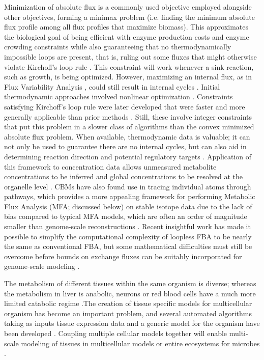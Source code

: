 \documentclass[phd,tocprelim]{cornell}
\begin{document}
Minimization of absolute flux is a commonly used objective employed
alongside other objectives, forming a minimax problem (i.e. finding
the minimum absolute flux profile among all flux profiles that
maximize biomass). This approximates the biological goal of being
efficient with enzyme production costs and enzyme crowding constraints
while also guaranteeing that no thermodynamically impossible loops are
present, that is, ruling out some fluxes that might otherwise violate
Kirchoff’s loop rule \citep{Smallbone2009a, Schellenberger2011}.  This
constraint will work whenever a sink reaction, such as growth, is
being optimized.  However, maximizing an internal flux, as in Flux
Variability Analysis \citep{Orth2010}, could still result in internal
cycles \citep{Schellenberger2011}. Initial thermodynamic approaches
involved nonlinear optimization \citep{Beard2002, Henry2006,
Henry2007, Kummel2006}. Constraints satisfying Kirchoff’s loop rule
were later developed that were faster and more generally applicable
than prior methods \citep{Schellenberger2011, Muller2013}.  Still,
these involve integer constraints that put this problem in a slower
class of algorithms than the convex minimized absolute flux problem.
When available, thermodynamic data is valuable; it can not only be
used to guarantee there are no internal cycles, but can also aid in
determining reaction direction and potential regulatory targets
\citep{Schellenberger2011, Henry2006, Haraldsdottir2012,
DeMartino2012}. Application of this framework to concentration data
allows unmeasured metabolite concentrations to be inferred and global
concentrations to be resolved at the organelle level
\citep{Kummel2006}. CBMs have also found use in tracing individual
atoms through pathways, which provides a more appealing framework for
performing Metabolic Flux Analysis (MFA; discussed below) on stable
isotope data due to the lack of bias compared to typical MFA models,
which are often an order of magnitude smaller than genome-scale
reconstructions \citep{Ravikirthi2011}.  Recent insightful work has
made it possible to simplify the computational complexity of loopless
FBA to be nearly the same as conventional FBA, but some mathematical
difficulties must still be overcome before bounds on exchange fluxes
can be suitably incorporated for genome-scale modeling
\citep{Fleming2012, Warren2007}.


The metabolism of different tissues within the same organism is
diverse; whereas the metabolism in liver is anabolic, neurons or red
blood cells have a much more limited catabolic regime
\citep{Lewis2010, Jamshidi2006, Wang2012}.The creation of tissue
specific models for multicellular organism has become an important
problem, and several automated algorithms taking as inputs tissue
expression data and a generic model for the organism have been
developed \citep{Wang2012, Becker2008, Shlomi2008}. Coupling multiple
cellular models together will enable multi-scale modeling of tissues
in multicellular models or entire ecosystems for microbes
\citep{Lewis2010, Sun2012, Bordbar2010, Klitgord2011}.
\end{document}
